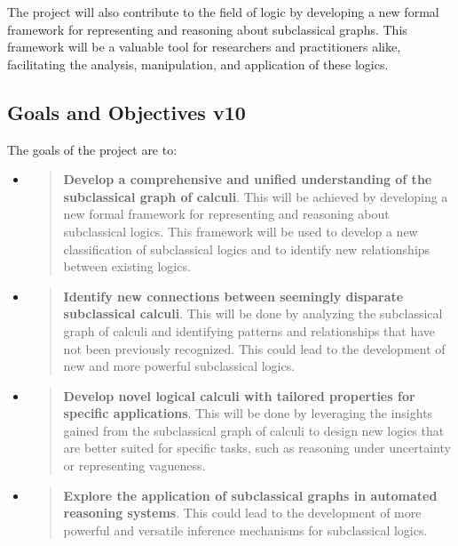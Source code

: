 The project will also contribute to the field of logic by developing a
new formal framework for representing and reasoning about subclassical
graphs. This framework will be a valuable tool for researchers and
practitioners alike, facilitating the analysis, manipulation, and
application of these logics.

\hypertarget{goals-and-objectives-v10}{%
\subsection{Goals and Objectives v10}\label{goals-and-objectives-v10}}

The goals of the project are to:

\begin{itemize}
\item
  \begin{quote}
  \textbf{Develop a comprehensive and unified understanding of the
  subclassical graph of calculi}. This will be achieved by developing a
  new formal framework for representing and reasoning about subclassical
  logics. This framework will be used to develop a new classification of
  subclassical logics and to identify new relationships between existing
  logics.
  \end{quote}
\item
  \begin{quote}
  \textbf{Identify new connections between seemingly disparate
  subclassical calculi}. This will be done by analyzing the subclassical
  graph of calculi and identifying patterns and relationships that have
  not been previously recognized. This could lead to the development of
  new and more powerful subclassical logics.
  \end{quote}
\item
  \begin{quote}
  \textbf{Develop novel logical calculi with tailored properties for
  specific applications}. This will be done by leveraging the insights
  gained from the subclassical graph of calculi to design new logics
  that are better suited for specific tasks, such as reasoning under
  uncertainty or representing vagueness.
  \end{quote}
\item
  \begin{quote}
  \textbf{Explore the application of subclassical graphs in automated
  reasoning systems}. This could lead to the development of more
  powerful and versatile inference mechanisms for subclassical logics.
  \end{quote}

\end{itemize}
